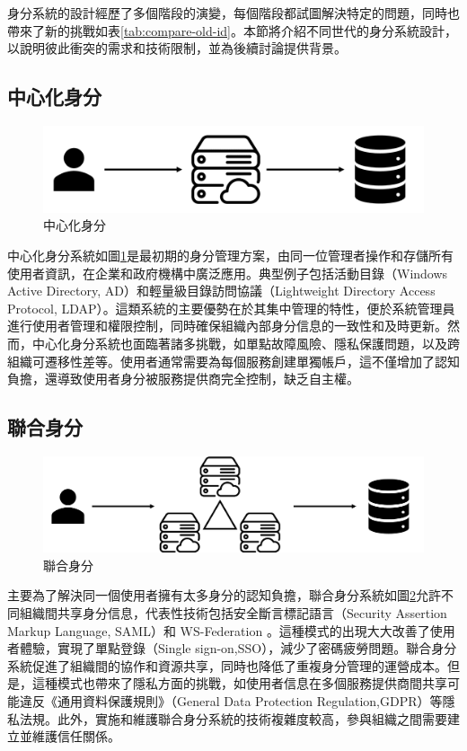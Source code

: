 身分系統的設計經歷了多個階段的演變，每個階段都試圖解決特定的問題，同時也帶來了新的挑戰如表\ref{tab:compare-old-id}。本節將介紹不同世代的身分系統設計，以說明彼此衝突的需求和技術限制，並為後續討論提供背景。
\subsection{中心化身分}
\begin{figure}
  \centering
  \includegraphics[width=\linewidth,keepaspectratio]{figures/mid-identity.png}
  \caption{中心化身分}
  \label{fig:mid-identity}
\end{figure}
中心化身分系統如圖\ref{fig:mid-identity}是最初期的身分管理方案，由同一位管理者操作和存儲所有使用者資訊，在企業和政府機構中廣泛應用。典型例子包括活動目錄（Windows Active Directory, AD）和輕量級目錄訪問協議（Lightweight Directory Access Protocol, LDAP）\cite{microsoft2021active, sermersheim2006lightweight}。這類系統的主要優勢在於其集中管理的特性，便於系統管理員進行使用者管理和權限控制，同時確保組織內部身分信息的一致性和及時更新。然而，中心化身分系統也面臨著諸多挑戰，如單點故障風險、隱私保護問題，以及跨組織可遷移性差等。使用者通常需要為每個服務創建單獨帳戶，這不僅增加了認知負擔\cite{josang2007security}，還導致使用者身分被服務提供商完全控制，缺乏自主權。
\subsection{聯合身分}
\begin{figure}
  \centering
  \includegraphics[width=\linewidth,keepaspectratio]{figures/group-identity.png}
  \caption{聯合身分}
  \label{fig:group-identity}
\end{figure}
主要為了解決同一個使用者擁有太多身分的認知負擔，聯合身分系統如圖\ref{fig:group-identity}允許不同組織間共享身分信息，代表性技術包括安全斷言標記語言（Security Assertion Markup Language, SAML）和 WS-Federation \cite{oasis2005security, goodner2009web}。這種模式的出現大大改善了使用者體驗，實現了單點登錄（Single sign-on,SSO），減少了密碼疲勞問題。聯合身分系統促進了組織間的協作和資源共享，同時也降低了重複身分管理的運營成本。但是，這種模式也帶來了隱私方面的挑戰\cite{ahn2007user}，如使用者信息在多個服務提供商間共享可能違反《通用資料保護規則》（General Data Protection Regulation,GDPR）\cite{GDPR2016}等隱私法規。此外，實施和維護聯合身分系統的技術複雜度較高，參與組織之間需要建立並維護信任關係。
